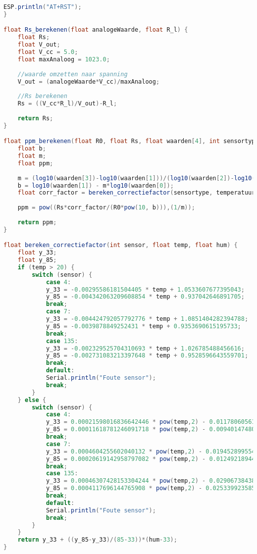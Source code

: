 \begin{lstlisting}[language=Java,caption={MQ sensoren naar Thingspeak}]
    ESP.println("AT+RST");
}

float Rs_berekenen(float analogeWaarde, float R_l) {
    float Rs;
    float V_out;
    float V_cc = 5.0;
    float maxAnaloog = 1023.0;
    
    //waarde omzetten naar spanning
    V_out = (analogeWaarde*V_cc)/maxAnaloog;
    
    //Rs berekenen
    Rs = ((V_cc*R_l)/V_out)-R_l;
    
    return Rs;
}

float ppm_berekenen(float R0, float Rs, float waarden[4], int sensortype, float temperatuur, float vochtigheid) {
    float b;
    float m;
    float ppm;
    
    m = (log10(waarden[3])-log10(waarden[1]))/(log10(waarden[2])-log10(waarden[0]));
    b = log10(waarden[1]) - m*log10(waarden[0]);
    float corr_factor = bereken_correctiefactor(sensortype, temperatuur, vochtigheid);
    
    ppm = pow((Rs*corr_factor/(R0*pow(10, b))),(1/m));
    
    return ppm;
}

float bereken_correctiefactor(int sensor, float temp, float hum) {
    float y_33;
    float y_85;
    if (temp > 20) {
        switch (sensor) {
            case 4:
            y_33 = -0.00295586181504405 * temp + 1.0533607677395043;
            y_85 = -0.004342063209608854 * temp + 0.937042646891705;
            break;
            case 7:
            y_33 = -0.004424792057792776 * temp + 1.0851404282394788;
            y_85 = -0.0039878849252431 * temp + 0.9353690615195733;
            break;
            case 135:
            y_33 = -0.002329525704310693 * temp + 1.026785488456616;
            y_85 = -0.002731083213397648 * temp + 0.9528596643559701;
            break;
            default:
            Serial.println("Foute sensor");
            break;
        }
    } else {
        switch (sensor) {
            case 4:
            y_33 = 0.00021598016836642446 * pow(temp,2) - 0.011780605617435404 * temp + 1.1489572784939854;
            y_85 = 0.00011618781246091718 * pow(temp,2) - 0.009401474805251435 * temp + 0.9921017705779126;
            break;
            case 7:
            y_33 = 0.0004604255602040132 * pow(temp,2) - 0.019452899554979888 * temp + 1.2135189729083746;
            y_85 = 0.00020619142958797082 * pow(temp,2) - 0.01249218944803551 * temp + 1.0274335776434782;
            break;
            case 135:
            y_33 = 0.00046307428153304244 * pow(temp,2) - 0.02906738438091286 * temp + 1.3784941304658396;
            y_85 = 0.0004117696144765908 * pow(temp,2) - 0.025339923585248027 * temp + 1.245958990497358;
            break;
            default:
            Serial.println("Foute sensor");
            break;
        }
    }
    return y_33 + ((y_85-y_33)/(85-33))*(hum-33);
}
        
\end{lstlisting}

